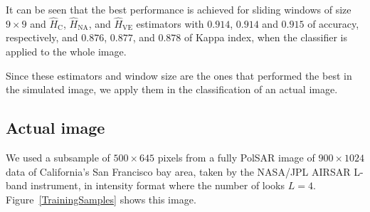 \documentclass[journal]{IEEEtran}
\begin{document}

It can be seen that the best performance is achieved for sliding windows of size $9 \times 9$ and $\widehat{H}_\text{C}$, $\widehat{H}_{\text{NA}}$, and $\widehat{H}_{\text{VE}}$ estimators with $0.914$, $0.914$ and $0.915$ of accuracy, respectively, and  $0.876$, $0.877$, and $0.878$ of Kappa index, when the classifier is applied to the whole image.

Since these estimators and window size are the ones that performed the best in the simulated image, we apply them in the classification of an actual image.

\subsection{Actual image}

We used a subsample of $500 \times 645$ pixels from a fully PolSAR image of $900 \times 1024$ data of California's San Francisco bay area, taken by the NASA/JPL AIRSAR L-band instrument, in intensity format where the number of looks $L=4$. Figure~\ref{TrainingSamples} shows this image.
\end{document}
